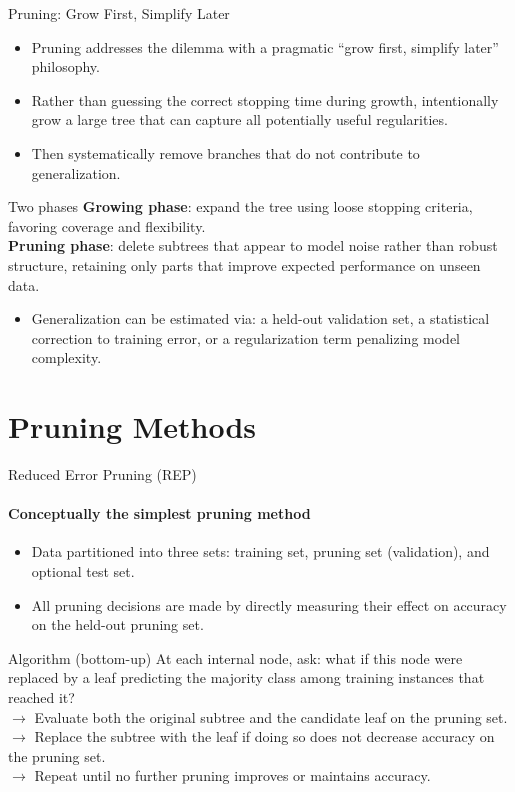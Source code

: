 \begin{frame}{Pruning: Grow First, Simplify Later}
  \begin{itemize}
    \item Pruning addresses the dilemma with a pragmatic \alert{``grow first, simplify later''} philosophy.
    \item Rather than guessing the correct stopping time during growth, \alert{intentionally grow a
          large tree} that can capture all potentially useful regularities.
    \item Then \alert{systematically remove} branches that do not contribute to generalization.
  \end{itemize}
  \begin{block}{Two phases}
    \textbf{Growing phase}: expand the tree using loose stopping criteria, favoring coverage
    and flexibility.\\[0.3em]
    \textbf{Pruning phase}: delete subtrees that appear to model noise rather than robust
    structure, retaining only parts that improve expected performance on unseen data.
  \end{block}
  \begin{itemize}
    \item Generalization can be estimated via: a held-out \alert{validation set}, a
          \alert{statistical correction} to training error, or a \alert{regularization term}
          penalizing model complexity.
  \end{itemize}
\end{frame}

\section{Pruning Methods}

\begin{frame}{Reduced Error Pruning (REP)}
  \framesubtitle{Conceptually the simplest pruning method}
  \begin{itemize}
    \item Data partitioned into three sets: \alert{training set}, \alert{pruning set} (validation),
          and optional test set.
    \item All pruning decisions are made by directly measuring their effect on accuracy on
          the held-out \alert{pruning set}.
  \end{itemize}
  \begin{block}{Algorithm (bottom-up)}
    At each internal node, ask: what if this node were replaced by a leaf predicting the
    majority class among training instances that reached it?\\
    $\to$ Evaluate both the original subtree and the candidate leaf on the pruning set.\\
    $\to$ Replace the subtree with the leaf if doing so \alert{does not decrease accuracy} on
    the pruning set.\\
    $\to$ Repeat until no further pruning improves or maintains accuracy.
  \end{block}
\end{frame}

